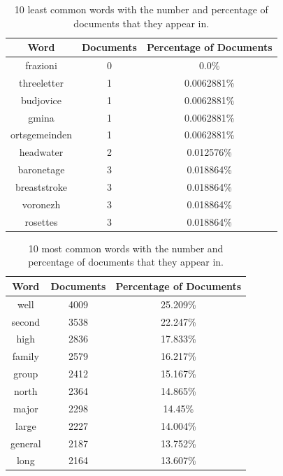 \documentclass{article} %
\begin{document}
\begin{table}[t]
\caption{10 least common words with the number and percentage of documents that they appear in.}
\label{least-common-words-table}
\begin{center}
    \begin{tabular}{ | c | c | c |}
    \hline
    \textbf{Word} & \textbf{Documents} & \textbf{Percentage of Documents} \\ \hline

frazioni & 0 & 0.0\% \\ \hline 
threeletter & 1 & 0.0062881\% \\ \hline 
budjovice & 1 & 0.0062881\% \\ \hline 
gmina & 1 & 0.0062881\% \\ \hline 
ortsgemeinden & 1 & 0.0062881\% \\ \hline 
headwater & 2 & 0.012576\% \\ \hline 
baronetage & 3 & 0.018864\% \\ \hline 
breaststroke & 3 & 0.018864\% \\ \hline 
voronezh & 3 & 0.018864\% \\ \hline 
rosettes & 3 & 0.018864\% \\ \hline 

\end{tabular}
\end{center}
\end{table}

\begin{table}[t]
\caption{10 most common words with the number and percentage of documents that they appear in.}
\label{most-common-words-table}
\begin{center}
    \begin{tabular}{ | c | c | c |}
    \hline
    \textbf{Word} & \textbf{Documents} & \textbf{Percentage of Documents} \\ \hline

well & 4009 & 25.209\% \\ \hline 
second & 3538 & 22.247\% \\ \hline 
high & 2836 & 17.833\% \\ \hline 
family & 2579 & 16.217\% \\ \hline 
group & 2412 & 15.167\% \\ \hline 
north & 2364 & 14.865\% \\ \hline 
major & 2298 & 14.45\% \\ \hline 
large & 2227 & 14.004\% \\ \hline 
general & 2187 & 13.752\% \\ \hline 
long & 2164 & 13.607\% \\ \hline 

\end{tabular}
\end{center}
\end{table}
\end{document}
